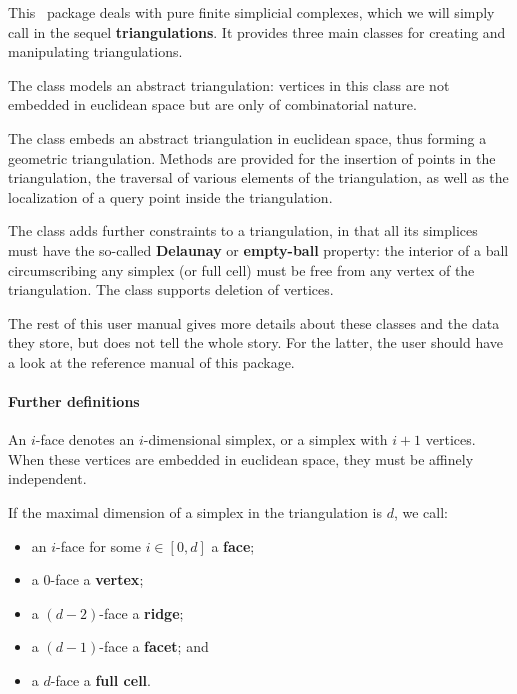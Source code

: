 This \cgal\ package deals with pure finite simplicial complexes, which
we will simply call in the sequel \textbf{triangulations}. It provides three main classes
for creating and manipulating triangulations.

The class  models an abstract triangulation: vertices in this
class are not embedded in euclidean space but are only of combinatorial
nature.

The class  embeds an abstract
triangulation in euclidean space, thus forming a geometric
triangulation. Methods are
provided for the insertion %
of points in the triangulation, the
traversal of various elements of the triangulation, as well as the localization of a
query point inside the triangulation.

The class  adds further
constraints to a triangulation, in that all its simplices must have the
so-called \textbf{Delaunay} or \textbf{empty-ball} property: the interior of
a ball circumscribing any simplex (or full cell) must be free from any
vertex of the triangulation. The  class
supports deletion of vertices.


The rest of this user manual gives more details about these classes and the
data they store, but does not tell the whole story. For the latter, the user
should have a look at the reference manual of this package. 


\paragraph{Further definitions}

An $i$-face denotes an $i$-dimensional simplex, or a simplex with $i+1$
vertices. When these vertices are embedded in euclidean space, they must be
affinely independent.

If the maximal dimension of a simplex in the triangulation is
$d$, we call:\begin{itemize}
\item an $i$-face for some $i\in[0,d]$ a  \textbf{face};
\item a $0$-face a \textbf{vertex};
\item a $(d-2)$-face a \textbf{ridge};
\item a $(d-1)$-face a \textbf{facet}; and
\item a $d$-face  a \textbf{full cell}.
\end{itemize}


